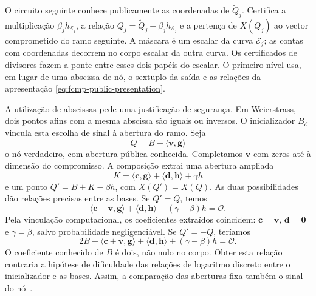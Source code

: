 O circuito seguinte conhece publicamente as coordenadas de
\(\widetilde Q_j\). Certifica a multiplicação
\(\beta_jh_{\mathcal E_j}\), a relação
\(Q_j=\widetilde Q_j-\beta_jh_{\mathcal E_j}\) e a pertença
de \(X(Q_j)\) ao vector comprometido do ramo seguinte.
A máscara é um escalar da curva \(\mathcal E_j\); as contas
com coordenadas decorrem no corpo escalar da outra curva.
Os certificados de divisores fazem a ponte entre esses
dois papéis do escalar. O primeiro nível usa, em lugar
de uma abscissa de nó, o sextuplo da saída e as relações
da apresentação \eqref{eq:fcmp-public-presentation}.

A utilização de abscissas pede uma justificação de segurança.
Em Weierstrass, dois pontos afins com a mesma abscissa são
iguais ou inversos. O inicializador
\(B_{\mathcal E}\) vincula esta escolha de sinal à abertura
do ramo. Seja
\[
 Q=B+\langle\boldsymbol v,\boldsymbol g\rangle
\]
o nó verdadeiro, com abertura pública conhecida. Completamos
\(\boldsymbol v\) com zeros até à dimensão do compromisso.
A composição extrai uma abertura ampliada
\[
 K=\langle\boldsymbol c,\boldsymbol g\rangle
       +\langle\boldsymbol d,\boldsymbol h\rangle+\gamma h
\]
e um ponto \(Q'=B+K-\beta h\), com \(X(Q')=X(Q)\).
As duas possibilidades dão relações precisas entre as bases.
Se \(Q'=Q\), temos
\[
 \langle\boldsymbol c-\boldsymbol v,\boldsymbol g\rangle
       +\langle\boldsymbol d,\boldsymbol h\rangle
       +(\gamma-\beta)h=\mathcal O.
\]
Pela vinculação computacional, os coeficientes extraídos
coincidem: \(\boldsymbol c=\boldsymbol v\),
\(\boldsymbol d=\boldsymbol0\) e \(\gamma=\beta\), salvo
probabilidade negligenciável.
Se \(Q'=-Q\), teríamos
\[
 2B+\langle\boldsymbol c+\boldsymbol v,\boldsymbol g\rangle
       +\langle\boldsymbol d,\boldsymbol h\rangle
       +(\gamma-\beta)h=\mathcal O.
\]
O coeficiente conhecido de \(B\) é dois, não nulo no corpo.
Obter esta relação contraria a hipótese de dificuldade das
relações de logaritmo discreto entre o inicializador e
as bases. Assim, a comparação das aberturas fixa também
o sinal do nó~\cite{fcmp-plus-plus-paper}.

